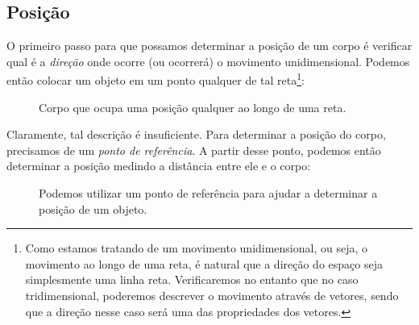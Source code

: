 \subsection{Posição}

O primeiro passo para que possamos determinar a posição de um corpo  é verificar qual é a \emph{direção} onde ocorre (ou ocorrerá) o movimento unidimensional. Podemos então colocar um objeto em um ponto qualquer de tal reta\footnote[][-3cm]{Como estamos tratando de um movimento unidimensional, ou seja, o movimento ao longo de uma reta, é natural que a direção do espaço seja simplesmente uma linha reta. Verificaremos no entanto que no caso tridimensional, poderemos descrever o movimento através de vetores, sendo que a direção nesse caso será uma das propriedades dos vetores.}:

\begin{figure}
\centering
{}
\caption{Corpo que ocupa uma posição qualquer ao longo de uma reta.}
\end{figure}

\noindent{}Claramente, tal descrição é insuficiente. Para determinar a posição do corpo, precisamos de um \emph{ponto de referência}. A partir desse ponto, podemos então determinar a posição medindo a distância entre ele e o corpo:

\begin{figure}
\centering
{}
\caption{Podemos utilizar um ponto de referência para ajudar a determinar a posição de um objeto.}
\end{figure}

